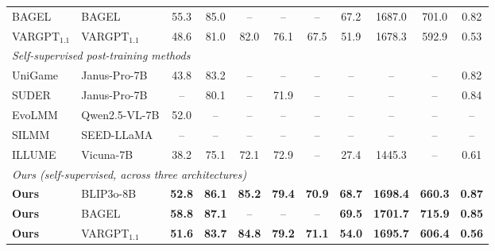 \begin{table}[!htb]
{\begin{tabular}{@{}llccccccccc@{}}
    BAGEL & BAGEL & 55.3 & 85.0 & -- & -- & -- & 67.2 & 1687.0 & 701.0 & 0.82 \\
    VARGPT$_{1.1}$ & VARGPT$_{1.1}$ & 48.6 & 81.0 & 82.0 & 76.1 & 67.5 & 51.9 & 1678.3 & 592.9 & 0.53 \\
    \midrule
    \multicolumn{11}{l}{\emph{Self-supervised post-training methods}} \\
    UniGame \cite{su2025unigame} & Janus-Pro-7B & 43.8 & 83.2 & -- & -- & -- & -- & -- & -- & 0.82 \\
    SUDER \cite{hong2025dualselfrewards} & Janus-Pro-7B & -- & 80.1 & -- & 71.9 & -- & -- & -- & -- & 0.84 \\
    EvoLMM \cite{thawakar2025evolmm} & Qwen2.5-VL-7B & 52.0 & -- & -- & -- & -- & -- & -- & -- & -- \\
    SILMM \cite{qu2024silmm} & SEED-LLaMA & -- & -- & -- & -- & -- & -- & -- & -- & -- \\
    ILLUME \cite{wang2024illume} & Vicuna-7B & 38.2 & 75.1 & 72.1 & 72.9 & -- & 27.4 & 1445.3 & -- & 0.61 \\
    \midrule
    \multicolumn{11}{l}{\emph{Ours (self-supervised, across three architectures)}} \\
    \textbf{Ours} & BLIP3o-8B & \textbf{52.8} & \textbf{86.1} & \textbf{85.2} & \textbf{79.4} & \textbf{70.9} & \textbf{68.7} & \textbf{1698.4} & \textbf{660.3} & \textbf{0.87} \\
    \textbf{Ours} & BAGEL & \textbf{58.8} & \textbf{87.1} & -- & -- & -- & \textbf{69.5} & \textbf{1701.7} & \textbf{715.9} & \textbf{0.85} \\
    \textbf{Ours} & VARGPT$_{1.1}$ & \textbf{51.6} & \textbf{83.7} & \textbf{84.8} & \textbf{79.2} & \textbf{71.1} & \textbf{54.0} & \textbf{1695.7} & \textbf{606.4} & \textbf{0.56} \\
    \bottomrule
  \end{tabular}%
  }
\end{table}
